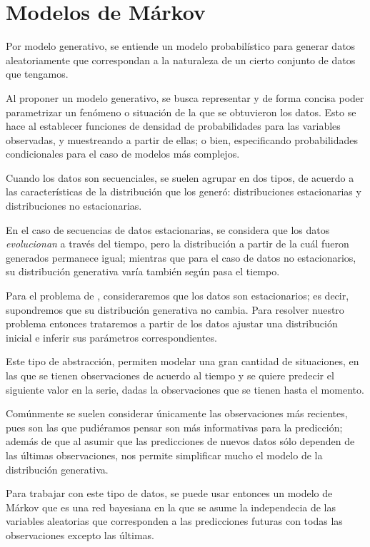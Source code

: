 
\chapter{Modelos de Márkov}\label{ch:chap2}

Por modelo generativo, se entiende un modelo probabilístico para generar datos aleatoriamente que correspondan a la naturaleza de un cierto conjunto de datos que tengamos.

Al proponer un modelo generativo, se busca representar y de forma concisa poder parametrizar un fenómeno o situación de la que se obtuvieron los datos. Esto se hace al establecer funciones de densidad de probabilidades para las variables observadas, y muestreando a partir de ellas; o bien, especificando probabilidades condicionales para el caso de modelos más complejos.

Cuando los datos son secuenciales, se suelen agrupar en dos tipos, de acuerdo a las características de la distribución que los generó: distribuciones estacionarias y distribuciones no estacionarias.

En el caso de secuencias de datos estacionarias, se considera que los datos \textit{evolucionan} a través del tiempo, pero la distribución a partir de la cuál fueron generados permanece igual; mientras que para el caso de datos no estacionarios, su distribución generativa varía también según pasa el tiempo.

Para el problema de \sd, consideraremos que los datos son estacionarios; es decir, supondremos que su distribución generativa no cambia. Para resolver nuestro problema entonces trataremos a partir de los datos ajustar una distribución inicial e inferir sus parámetros correspondientes.

Este tipo de abstracción, permiten modelar una gran cantidad de situaciones, en las que se tienen observaciones de acuerdo al tiempo y se quiere predecir el siguiente valor en la serie, dadas la observaciones que se tienen hasta el momento.

Comúnmente se suelen considerar únicamente las observaciones más recientes, pues son las que pudiéramos pensar son más informativas para la predicción; además de que al asumir que las predicciones de nuevos datos sólo dependen de las últimas observaciones, nos permite simplificar mucho el modelo de la distribución generativa.

Para trabajar con este tipo de datos, se puede usar entonces un modelo de Márkov que es una red bayesiana en la que se asume la independecia de las variables aleatorias que corresponden a las predicciones futuras con todas las observaciones excepto las últimas.


